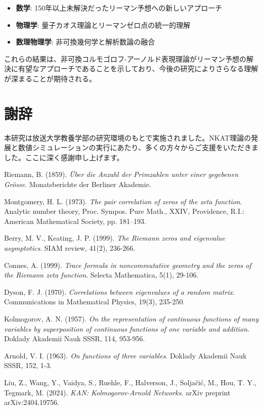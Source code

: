 \documentclass[12pt]{article}
\begin{document}
\begin{itemize}
\item \textbf{数学}: 150年以上未解決だったリーマン予想への新しいアプローチ
\item \textbf{物理学}: 量子カオス理論とリーマンゼロ点の統一的理解
\item \textbf{数理物理学}: 非可換幾何学と解析数論の融合
\end{itemize}

これらの結果は、非可換コルモゴロフ-アーノルド表現理論がリーマン予想の解決に有望なアプローチであることを示しており、今後の研究によりさらなる理解が深まることが期待される。

\section*{謝辞}

本研究は放送大学教養学部の研究環境のもとで実施されました。NKAT理論の発展と数値シミュレーションの実行にあたり、多くの方々からご支援をいただきました。ここに深く感謝申し上げます。


\begin{thebibliography}{99}

Riemann, B. (1859). 
\textit{Über die Anzahl der Primzahlen unter einer gegebenen Grösse}. 
Monatsberichte der Berliner Akademie.

Montgomery, H. L. (1973). 
\textit{The pair correlation of zeros of the zeta function}. 
Analytic number theory, Proc. Sympos. Pure Math., XXIV, Providence, R.I.: American Mathematical Society, pp. 181–193.

Berry, M. V., Keating, J. P. (1999). 
\textit{The Riemann zeros and eigenvalue asymptotics}. 
SIAM review, 41(2), 236-266.

Connes, A. (1999). 
\textit{Trace formula in noncommutative geometry and the zeros of the Riemann zeta function}. 
Selecta Mathematica, 5(1), 29-106.

Dyson, F. J. (1970). 
\textit{Correlations between eigenvalues of a random matrix}. 
Communications in Mathematical Physics, 19(3), 235-250.

Kolmogorov, A. N. (1957). 
\textit{On the representation of continuous functions of many variables by superposition of continuous functions of one variable and addition}. 
Doklady Akademii Nauk SSSR, 114, 953-956.

Arnold, V. I. (1963). 
\textit{On functions of three variables}. 
Doklady Akademii Nauk SSSR, 152, 1-3.

Liu, Z., Wang, Y., Vaidya, S., Ruehle, F., Halverson, J., Soljačić, M., Hou, T. Y., Tegmark, M. (2024). 
\textit{KAN: Kolmogorov-Arnold Networks}. 
arXiv preprint arXiv:2404.19756.

\end{thebibliography}
\end{document}
